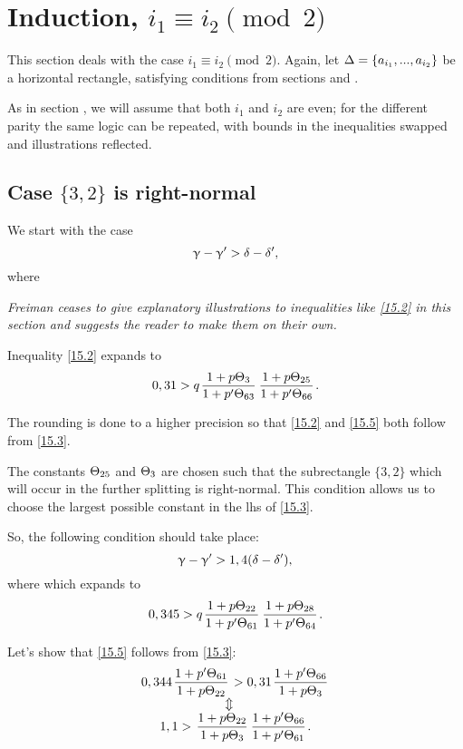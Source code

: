 \section{Induction, $i_1 \equiv i_2 \pmod 2$}

This section deals with the case $i_1 \equiv i_2 \pmod 2$.
Again, let $\Delta = \{ a_{i_1}, ..., a_{i_2}\}$ be a horizontal rectangle,
satisfying conditions from sections  and .

As in section , we will assume that both $i_1$ and $i_2$ are even;
for the different parity the same logic can be repeated,
with bounds in the inequalities swapped and illustrations reflected.

\subsection{Case $\{3,2\}$ is right-normal}

We start with the case
\begin{equation}\label{15.2}
	\upgamma - \upgamma' > \delta - \delta',
\end{equation}
where

\textit{
	Freiman ceases to give explanatory illustrations to inequalities like \ref{15.2} in this section
	and suggests the reader to make them on their own.
}

Inequality \ref{15.2} expands to
\begin{equation}\label{15.3}
	0,31 > q \up{3}{63} \up{25}{66}.
\end{equation}

The rounding is done to a higher precision
so that \ref{15.2} and \ref{15.5} both follow from \ref{15.3}.

The constants $\Theta_{25}$ and $\Theta_{3}$ are chosen such that the subrectangle $\{3,2\}$
which will occur in the further splitting is right-normal.
This condition allows us to choose the largest possible constant in the lhs of \ref{15.3}.

So, the following condition should take place:
\begin{equation}\label{15.4}
	\upgamma - \upgamma' > 1,4(\delta - \delta'),
\end{equation}
where
which expands to
\begin{equation}\label{15.5}
	0,345 > q \up{22}{61} \up{28}{64}.
\end{equation}

Let's show that \ref{15.5} follows from \ref{15.3}:
\begin{equation}\label{15.6}
	\begin{gathered}
		0,344 \pu{61}{22} > 0,31 \pu{66}{3}\\
		\ArrowBetweenLines
		1,1 > \uu{22}{3} \pp{66}{61}.
	\end{gathered}
\end{equation}

